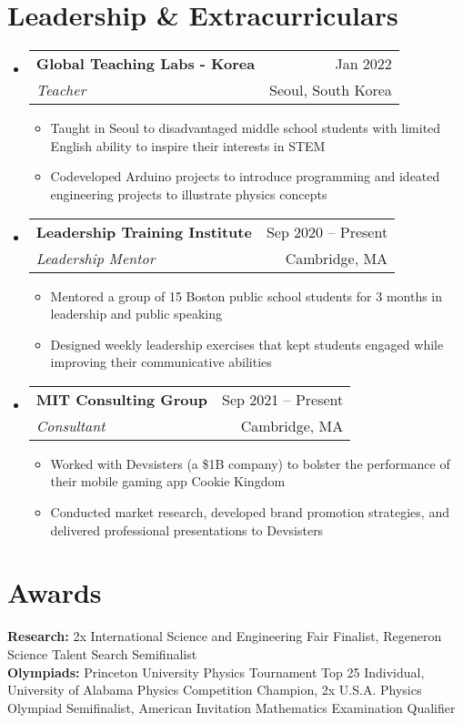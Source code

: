 \documentclass[letterpaper,11pt]{article}
\makeatletter
\newcommand{\resumeItem}[1]{
  \item\small{
    {#1 \vspace{-2pt}}
  }
}
\newcommand{\resumeSubheading}[4]{
  \vspace{-2pt}\item
    \begin{tabular*}{1.0\textwidth}[t]{l@{\extracolsep{\fill}}r}
      \textbf{#1} & {\small #2} \\
      \textit{\small#3} & {\small #4} \\
    \end{tabular*}\vspace{-7pt}
}
\newcommand{\resumeSubHeadingListStart}{\begin{itemize}[leftmargin=0.0in, label={}]}
\newcommand{\resumeSubHeadingListEnd}{\end{itemize}}
\newcommand{\resumeItemListStart}{\begin{itemize}}
\newcommand{\resumeItemListEnd}{\end{itemize}\vspace{-5pt}}
\makeatother
\begin{document}

\section{Leadership \& Extracurriculars}
  \resumeSubHeadingListStart
  
    \resumeSubheading
      {Global Teaching Labs - Korea}{Jan 2022}
      {Teacher}{Seoul, South Korea}
      \resumeItemListStart
        \resumeItem{Taught in Seoul to disadvantaged middle school students with limited English ability to inspire their interests in STEM}
        \resumeItem{Codeveloped Arduino projects to introduce programming and ideated engineering projects to illustrate physics concepts}
      \resumeItemListEnd

  \resumeSubHeadingListEnd
\vspace{-12pt}
  \resumeSubHeadingListStart
  
    \resumeSubheading
      {Leadership Training Institute}{Sep 2020 -- Present}
      {Leadership Mentor}{Cambridge, MA}
      \resumeItemListStart
        \resumeItem{Mentored a group of 15 Boston public school students for 3 months in leadership and public speaking}
        \resumeItem{Designed weekly leadership exercises that kept students engaged while improving their communicative abilities}
      \resumeItemListEnd

  \resumeSubHeadingListEnd
  
\vspace{-12pt}
  \resumeSubHeadingListStart
  
    \resumeSubheading
      {MIT Consulting Group}{Sep 2021 -- Present}
      {Consultant}{Cambridge, MA}
      \resumeItemListStart
        \resumeItem{Worked with Devsisters (a \$1B company) to bolster the performance of their mobile gaming app Cookie Kingdom}
        \resumeItem{Conducted market research, developed brand promotion strategies, and delivered professional presentations to Devsisters}
      \resumeItemListEnd

  \resumeSubHeadingListEnd
\vspace{-22pt}


\section{Awards}
\begin{itemize}[leftmargin=0.0in, label={}]
	\small{\item{
			\textbf{Research:} {2x International Science and Engineering Fair Finalist, Regeneron Science Talent Search Semifinalist} \\
			\textbf{Olympiads:} {Princeton University Physics Tournament Top 25 Individual, University of Alabama Physics Competition Champion, 2x U.S.A. Physics Olympiad Semifinalist, American Invitation Mathematics Examination Qualifier} \\

	}}
\end{itemize}


  
\end{document}
